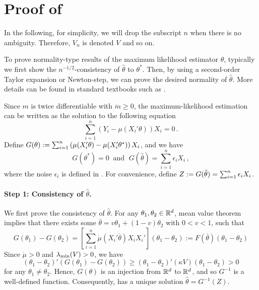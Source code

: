 \section{Proof of }
\label{sec:glm_ucb_proof}

In the following, for simplicity, we will drop the subscript $n$ when there is no ambiguity.  Therefore, $V_n$ is denoted $V$ and so on.

To prove normality-type results of the maximum likelihood estimator $\hat{\theta}$, typically we first show the $n^{-1/2}$-consistency of $\hat{\theta}$ to $\theta^*$. Then, by using a second-order Taylor expansion or Newton-step, we can prove the desired normality of $\hat{\theta}$.
More details can be found in standard textbooks such as \citet{van2000asymptotic}. %

Since $m$ is twice differentiable with $\ddot{m} \ge 0$, the maximum-likelihood estimation can be written as the solution to the following equation
\begin{equation} \label{eq:score}
\sum_{i=1}^{n} \left(Y_i-\mu(X_i'\theta)\right) X_i= 0\,.
\end{equation}
Define 
$G(\theta) := \sum_{i=1}^{n} \left(\mu(X_i'\theta)-\mu(X_i'\theta^*)\right) X_i$,
and we have 
\begin{equation} \label{eq:mle}
G(\theta^*)=0 \;\; \text{and }\; G(\hat{\theta})=\sum_{i=1}^{n} \epsilon_i X_i\,,
\end{equation} 
where the noise $\epsilon_i$ is defined in .  For convenience, define $Z := G(\hat{\theta})=\sum_{i=1}^{n} \epsilon_i X_i$.

\paragraph{Step 1: Consistency of $\hat{\theta}$.} We first prove the consistency of $\hat{\theta}.$ For any $\theta_1, \theta_2 \in \mathbb{R}^d$, mean value theorem implies that there exists some $\bar{\theta}=v\theta_1+(1-v)\theta_2$ with $0<v<1$, such that
\begin{equation} \label{eq:taylor1}
G(\theta_1) - G(\theta_2) =\left [\sum_{i=1}^{n}\dot{\mu}(X_i' \bar{\theta})X_iX_i' \right](\theta_1-\theta_2):=F(\bar{\theta})(\theta_1-\theta_2)
\end{equation}
Since $\dot{\mu}>0$ and $\lambda_{\min}(V) > 0$, we have
\[
(\theta_1-\theta_2)'(G(\theta_1)-G(\theta_2)) \ge (\theta_1-\theta_2)' (\kappa V) (\theta_1-\theta_2) > 0
\]
for any $\theta_1 \neq \theta_2$. Hence, $G(\theta)$ is an injection from $\mathbb{R}^d$ to $\mathbb{R}^d$, and so $G^{-1}$ is a well-defined function. Consequently,  has a unique solution $ \hat{\theta} = G^{-1}(Z)$.

